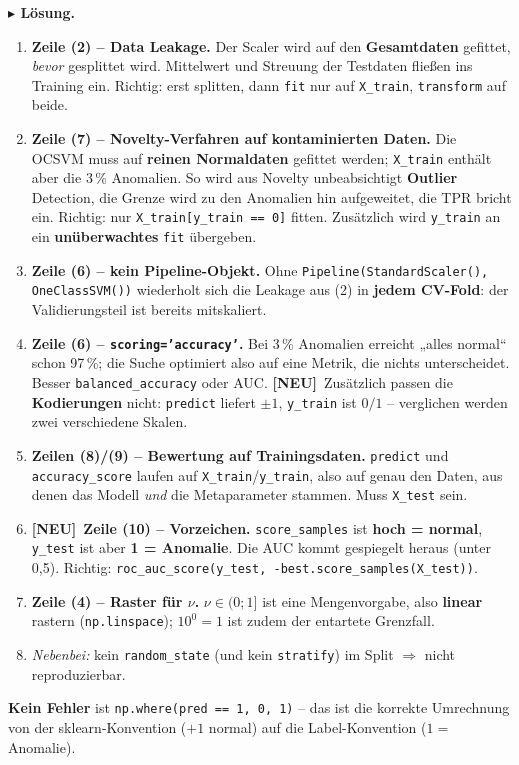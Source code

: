 \documentclass[10pt,a4paper]{article}
\newcommand{\neu}{{\color{neurot}\footnotesize\bfseries[NEU]}\ }
\newenvironment{loes}%
  {\par\vspace{2pt}\begingroup\small\noindent\textbf{\color{loesfarbe}$\blacktriangleright$ Lösung.}\ }%
  {\endgroup\par\vspace{5pt}}
\begin{document}
\begin{loes}
\begin{enumerate}
\item \textbf{Zeile (2) -- Data Leakage.} Der Scaler wird auf den \textbf{Gesamtdaten} gefittet,
  \emph{bevor} gesplittet wird. Mittelwert und Streuung der Testdaten fließen ins Training ein.
  Richtig: erst splitten, dann \texttt{fit} nur auf \texttt{X\_train},
  \texttt{transform} auf beide.
\item \textbf{Zeile (7) -- Novelty-Verfahren auf kontaminierten Daten.} Die OCSVM muss auf
  \textbf{reinen Normaldaten} gefittet werden; \texttt{X\_train} enthält aber die 3\,\% Anomalien.
  So wird aus Novelty unbeabsichtigt \textbf{Outlier} Detection, die Grenze wird zu den Anomalien
  hin aufgeweitet, die TPR bricht ein. Richtig: nur \texttt{X\_train[y\_train == 0]} fitten.
  Zusätzlich wird \texttt{y\_train} an ein \textbf{unüberwachtes} \texttt{fit} übergeben.
\item \textbf{Zeile (6) -- kein Pipeline-Objekt.} Ohne
  \texttt{Pipeline(StandardScaler(), OneClassSVM())} wiederholt sich die Leakage aus (2) in
  \textbf{jedem CV-Fold}: der Validierungsteil ist bereits mitskaliert.
\item \textbf{Zeile (6) -- \texttt{scoring='accuracy'}.} Bei 3\,\% Anomalien erreicht „alles
  normal`` schon 97\,\%; die Suche optimiert also auf eine Metrik, die nichts unterscheidet.
  Besser \texttt{balanced\_accuracy} oder AUC.
  \neu Zusätzlich passen die \textbf{Kodierungen} nicht: \texttt{predict} liefert $\pm1$,
  \texttt{y\_train} ist $0/1$ -- verglichen werden zwei verschiedene Skalen.
\item \textbf{Zeilen (8)/(9) -- Bewertung auf Trainingsdaten.} \texttt{predict} und
  \texttt{accuracy\_score} laufen auf \texttt{X\_train}/\texttt{y\_train}, also auf genau den
  Daten, aus denen das Modell \emph{und} die Metaparameter stammen. Muss \texttt{X\_test} sein.
\item \neu \textbf{Zeile (10) -- Vorzeichen.} \texttt{score\_samples} ist \textbf{hoch = normal},
  \texttt{y\_test} ist aber \textbf{1 = Anomalie}. Die AUC kommt gespiegelt heraus (unter 0,5).
  Richtig: \texttt{roc\_auc\_score(y\_test, -best.score\_samples(X\_test))}.
\item \textbf{Zeile (4) -- Raster für $\nu$.} $\nu \in (0;1]$ ist eine Mengenvorgabe, also
  \textbf{linear} rastern (\texttt{np.linspace}); $10^0 = 1$ ist zudem der entartete Grenzfall.
\item \emph{Nebenbei:} kein \texttt{random\_state} (und kein \texttt{stratify}) im Split
  $\Rightarrow$ nicht reproduzierbar.
\end{enumerate}
\textbf{Kein Fehler} ist \texttt{np.where(pred == 1, 0, 1)} -- das ist die korrekte Umrechnung von
der sklearn-Konvention ($+1$ normal) auf die Label-Konvention ($1 =$ Anomalie).
\end{loes}
\end{document}

